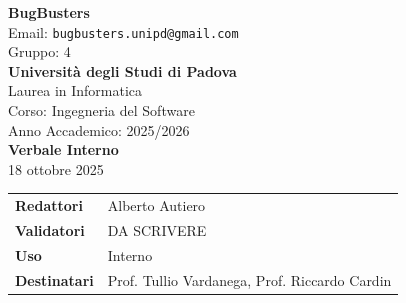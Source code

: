 \documentclass[a4paper,12pt]{article}
\begin{document}
\begin{center}
  
  {\Large\bfseries\color{primaryblue} BugBusters}\\[0.3cm]
  {\small\color{darkgray} Email: \texttt{bugbusters.unipd@gmail.com}} \\[0.1cm]
  {\small\color{darkgray} Gruppo: 4} \\[0.5cm]

  {\large\bfseries Università degli Studi di Padova}\\[0.3cm]
  {\small Laurea in Informatica}\\[0.2cm]
  {\small Corso: Ingegneria del Software}\\[0.2cm]
  {\small Anno Accademico: 2025/2026}\\[0.8cm]

  {\Huge\bfseries\color{primaryblue} Verbale Interno}\\[0.3cm]
  {\Large\color{secondaryblue} 18 ottobre 2025}\\[0.8cm]
\end{center}

\begin{center}
\begin{tcolorbox}[colback=lightgray,colframe=primaryblue,width=0.85\textwidth,arc=3mm,boxrule=0.5pt]
\begin{tabular}{@{}ll@{}}
\textbf{Redattori}    & Alberto Autiero \\
\textbf{Validatori}    & DA SCRIVERE \\
\textbf{Uso}          & Interno \\
\textbf{Destinatari}  & Prof. Tullio Vardanega, Prof. Riccardo Cardin \\
\end{tabular}
\end{tcolorbox}
\end{center}
\end{document}
